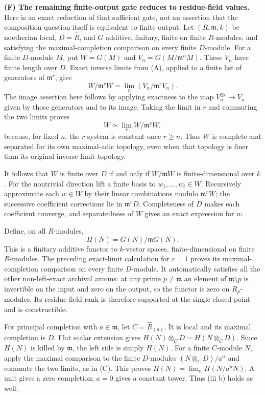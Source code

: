 \textbf{(F) The remaining finite-output gate reduces to residue-field values.}
Here is an exact reduction of that sufficient gate, not an assertion
that the composition question itself is equivalent to finite output.
Let $(R,\mathfrak m,k)$ be noetherian local, $D=\widehat R$, and
$G$ additive, finitary, finite on finite $R$-modules, and satisfying
the maximal-completion comparison on every finite $D$-module.
For a finite $D$-module $M$, put $W=G(M)$ and
$V_n=G(M/\mathfrak m^nM)$. These $V_n$ have finite length over $D$.
Exact inverse limits from (A), applied to a finite list of generators
of $\mathfrak m^r$, give
\[
 W/\mathfrak m^rW=\lim_n(V_n/\mathfrak m^rV_n).
\]
The image assertion here follows by applying exactness to the map
$V_n^{\oplus t}\to V_n$ given by those generators and to its image.
Taking the limit in $r$ and commuting the two limits proves
\[
 W\simeq\lim_r W/\mathfrak m^rW,
\]
because, for fixed $n$, the $r$-system is constant once $r\geq n$.
Thus $W$ is complete and separated for its own maximal-adic topology,
even when that topology is finer than its original inverse-limit topology.

It follows that $W$ is finite over $D$ if and only if
$W/\mathfrak mW$ is finite-dimensional over $k$. For the nontrivial
direction lift a finite basis to $w_1,\ldots,w_t\in W$. Recursively
approximate each $w\in W$ by their linear combinations modulo
$\mathfrak m^rW$; the successive coefficient corrections lie in
$\mathfrak m^rD$. Completeness of $D$ makes each coefficient converge,
and separatedness of $W$ gives an exact expression for $w$.

Define, on all $R$-modules,
\[
 H(N)=G(N)/\mathfrak mG(N).
\]
This is a finitary additive functor to $k$-vector spaces, finite-dimensional
on finite $R$-modules. The preceding exact-limit calculation for $r=1$
proves its maximal-completion comparison on every finite $D$-module.
It automatically satisfies all the other non-left-exact archival axioms:
at any prime $p\ne\mathfrak m$ an element of $\mathfrak m\setminus p$
is invertible on the input and zero on the output, so the functor is zero
on $R_p$-modules. Its residue-field rank is therefore supported at the
single closed point and is constructible.

For principal completion with $a\in\mathfrak m$, let
$C=\widehat R_{(a)}$. It is local and its maximal completion is $D$.
Flat scalar extension gives $H(N)\otimes_C D=H(N\otimes_C D)$.
Since $H(N)$ is killed by $\mathfrak m$, the left side is simply
$H(N)$. For a finite $C$-module $N$, apply the maximal comparison
to the finite $D$-modules $(N\otimes_C D)/a^n$ and commute the two
limits, as in (C). This proves
$H(N)=\lim_nH(N/a^nN)$. A unit gives a zero completion; $a=0$
gives a constant tower. Thus (iii b) holds as well.

